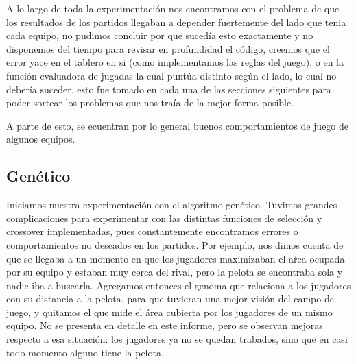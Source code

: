 
A lo largo de toda la experimentación nos encontramos con el problema de que los resultados de los partidos llegaban a depender
fuertemente del lado que tenia cada equipo, no pudimos concluir por que sucedía esto exactamente y no disponemos del tiempo
para revisar en profundidad el código, creemos que el error yace en el tablero en si (como implementamos las reglas del juego),
 o en la función evaluadora de jugadas la cual puntúa distinto según el lado, lo cual no debería suceder.
 esto fue tomado en cada una de las secciones siguientes para poder sortear los problemas que nos traía de la mejor forma posible.


A parte de esto, se ecuentran por lo general buenos comportamientos de juego de algunos equipos.

\subsection{Genético}


Iniciamos nuestra experimentación con el algoritmo genético.
Tuvimos grandes complicaciones para experimentar con las distintas funciones de selección y crossover implementadas, pues constantemente encontramos errores o comportamientos no deseados en los partidos.
Por ejemplo, nos dimos cuenta de que se llegaba a un momento en que los jugadores maximizaban el aŕea ocupada por su equipo y estaban muy cerca del rival, pero la pelota se encontraba sola y nadie iba a buscarla.
Agregamos entonces el genoma que relaciona a los jugadores con su distancia a la pelota, para que tuvieran una mejor visión del campo de juego, y quitamos el que mide el área cubierta por los jugadores de un mismo equipo.
No se presenta en detalle en este informe, pero se observan mejoras respecto a esa situación: los jugadores ya no se quedan trabados, sino que en casi todo momento alguno tiene la pelota.


